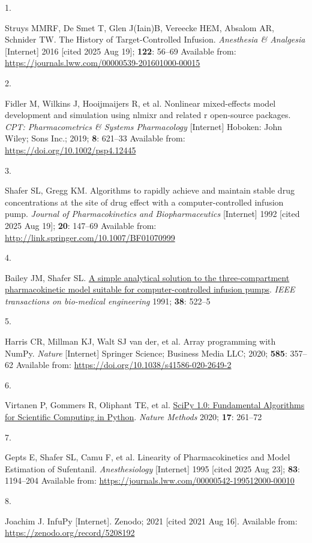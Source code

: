 \documentclass[
  letterpaper,
  DIV=11,
  numbers=noendperiod]{scrartcl}
\newlength{\cslhangindent}
\newlength{\csllabelwidth}
\newenvironment{CSLReferences}[2] %
 {\begin{list}{}{%
  \setlength{\itemindent}{0pt}
  \setlength{\leftmargin}{0pt}
  \setlength{\parsep}{0pt}
  \ifodd #1
   \setlength{\leftmargin}{\cslhangindent}
   \setlength{\itemindent}{-1\cslhangindent}
  \fi
  \setlength{\itemsep}{#2\baselineskip}}}
 {\end{list}}
\newcommand{\CSLLeftMargin}[1]{\parbox[t]{\csllabelwidth}{\strut#1\strut}}
\newcommand{\CSLRightInline}[1]{\parbox[t]{\linewidth - \csllabelwidth}{\strut#1\strut}}
\begin{document}
\label{refs}
\begin{CSLReferences}{0}{1}
\CSLLeftMargin{1. }%
\CSLRightInline{Struys MMRF, De Smet T, Glen J(Iain)B, Vereecke HEM,
Absalom AR, Schnider TW. The {History} of {Target}-{Controlled}
{Infusion}. \emph{Anesthesia \& Analgesia} {[}Internet{]} 2016 {[}cited
2025 Aug 19{]}; \textbf{122}: 56--69 Available from:
\url{https://journals.lww.com/00000539-201601000-00015}}

\CSLLeftMargin{2. }%
\CSLRightInline{Fidler M, Wilkins J, Hooijmaijers R, et al. Nonlinear
mixed-effects model development and simulation using nlmixr and related
r open-source packages. \emph{CPT: Pharmacometrics \& Systems
Pharmacology} {[}Internet{]} Hoboken: John Wiley; Sons Inc.; 2019;
\textbf{8}: 621--33 Available from:
\url{https://doi.org/10.1002/psp4.12445}}

\CSLLeftMargin{3. }%
\CSLRightInline{Shafer SL, Gregg KM. Algorithms to rapidly achieve and
maintain stable drug concentrations at the site of drug effect with a
computer-controlled infusion pump. \emph{Journal of Pharmacokinetics and
Biopharmaceutics} {[}Internet{]} 1992 {[}cited 2025 Aug 19{]};
\textbf{20}: 147--69 Available from:
\url{http://link.springer.com/10.1007/BF01070999}}

\CSLLeftMargin{4. }%
\CSLRightInline{Bailey JM, Shafer SL.
\href{https://doi.org/10.1109/10.81576}{A simple analytical solution to
the three-compartment pharmacokinetic model suitable for
computer-controlled infusion pumps}. \emph{IEEE transactions on
bio-medical engineering} 1991; \textbf{38}: 522--5 }

\CSLLeftMargin{5. }%
\CSLRightInline{Harris CR, Millman KJ, Walt SJ van der, et al. Array
programming with {NumPy}. \emph{Nature} {[}Internet{]} Springer Science;
Business Media {LLC}; 2020; \textbf{585}: 357--62 Available from:
\url{https://doi.org/10.1038/s41586-020-2649-2}}

\CSLLeftMargin{6. }%
\CSLRightInline{Virtanen P, Gommers R, Oliphant TE, et al.
\href{https://doi.org/10.1038/s41592-019-0686-2}{{{SciPy} 1.0:
Fundamental Algorithms for Scientific Computing in Python}}.
\emph{Nature Methods} 2020; \textbf{17}: 261--72 }

\CSLLeftMargin{7. }%
\CSLRightInline{Gepts E, Shafer SL, Camu F, et al. Linearity of
{Pharmacokinetics} and {Model} {Estimation} of {Sufentanil}.
\emph{Anesthesiology} {[}Internet{]} 1995 {[}cited 2025 Aug 23{]};
\textbf{83}: 1194--204 Available from:
\url{https://journals.lww.com/00000542-199512000-00010}}

\CSLLeftMargin{8. }%
\CSLRightInline{Joachim J. {InfuPy} {[}Internet{]}. Zenodo; 2021
{[}cited 2021 Aug 16{]}. Available from:
\url{https://zenodo.org/record/5208192}}

\end{CSLReferences}
\end{document}
